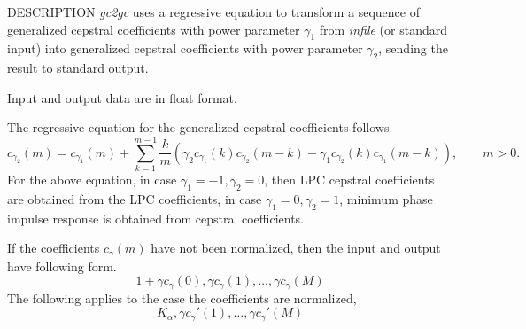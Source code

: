 \begin{synopsis}
\item [gc2gc] [ --m $M_1$ ] [ --g $G_1$ ] [ --c $C_1$ ] [ --n ] [ --u ] 
\item [\ ~~~~~~]  [ --M $M_2$ ] [ --G $G_2$ ] [ --C $C_2$ ] [ --N ] [ --U ] [ {\em infile} ]
\end{synopsis}

\begin{qsection}{DESCRIPTION}
{\em gc2gc} uses a regressive equation 
to transform a sequence of generalized cepstral coefficients 
with power parameter $\gamma_1$ from {\em infile} (or standard input)
into generalized cepstral coefficients with power parameter $\gamma_2$, 
sending the result to standard output.

Input and output data are in float format.

The regressive equation for the generalized cepstral coefficients 
follows.
\begin{displaymath}
  c_{\gamma_2}(m) = c_{\gamma_1}(m) + \sum_{k=1}^{m-1}\frac{k}{m}
                      (\gamma_2 c_{\gamma_1}(k)c_{\gamma_2}(m-k)
                  -\gamma_1 c_{\gamma_2}(k)
                        c_{\gamma_1}(m-k)), \qquad m>0.
\end{displaymath}
For the above equation, in case $\gamma_1=-1, \gamma_2=0$,
then LPC cepstral coefficients are obtained from the LPC coefficients,
in case $\gamma_1=0, \gamma_2=1$, minimum phase impulse response is
obtained from cepstral coefficients.

If the coefficients $c_\gamma(m)$ have not been normalized,
then the input and output have following form.
\begin{displaymath}
1+\gamma c_\gamma(0), \gamma c_\gamma(1), \dots, \gamma c_\gamma(M)
\end{displaymath}
The following applies to the case the coefficients are normalized,
\begin{displaymath}
K_\alpha,\gamma c_\gamma'(1),\dots, \gamma c_\gamma'(M)
\end{displaymath}

\end{qsection}

